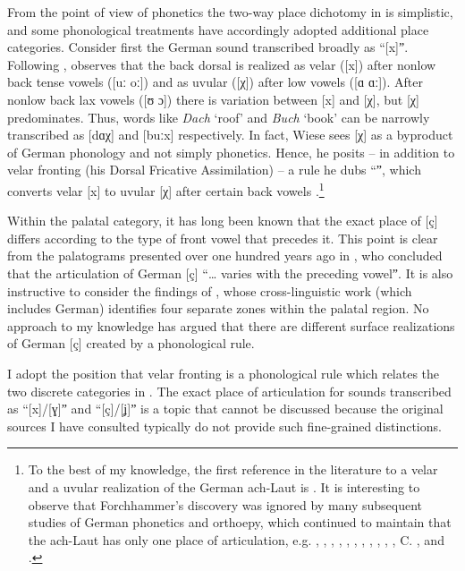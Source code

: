 From the point of view of phonetics the two-way place dichotomy in  is simplistic, and some phonological treatments have accordingly adopted additional place categories. Consider first the German sound transcribed broadly as “[x]ˮ. Following \citet{Kohler1990b, Kohler1990a}, \citet[210--216]{Wiese1996a} observes that the back dorsal is realized as velar ([x]) after nonlow back tense vowels ([uː oː]) and as uvular ([χ]) after low vowels ([ɑ ɑː]). After nonlow back lax vowels ([ʊ ɔ]) there is variation between [x] and [χ], but [χ] predominates. Thus, words like \textit{Dach} ‘roof’ and \textit{Buch} ‘book’ can be narrowly transcribed as [dɑχ] and [buːx] respectively. In fact, Wiese sees [χ] as a byproduct of German phonology and not simply phonetics. Hence, he posits -- in addition to velar fronting (his Dorsal Fricative Assimilation) {}-- a rule he dubs “ˮ, which converts velar [x] to uvular [χ] after certain back vowels \citep[213]{Wiese1996a}.\footnote{To the best of my knowledge, the first reference in the literature to a velar and a uvular realization of the German ach-Laut is \citet[164]{Forchhammer1994}. It is interesting to observe that Forchhammer's discovery was ignored by many subsequent studies of German phonetics and orthoepy, which continued to maintain that the ach-Laut has only one place of articulation, e.g. \citet[50-51]{Brandstein1950}, \citet[132-133]{Bithell1952}, \citet[76--77]{vonEssen1957}, \citet[153--154]{Heffner1960}, \citet[59]{Laziczius1961}, \citet[28--32]{Moulton1962}, \citet[176]{Richter1964}, \citet[167--168; 185--199]{MartensMartens1965}, \citet[88--89]{Schubiger1977}, \citet[39--40]{Wängler1981}, \citet[76--78]{Hakkarainen1995}, C. \citet[42--48]{Hall2003}, and \citet[76--78]{Russ2010}.}

Within the palatal category, it has long been known that the exact place of [ç] differs according to the type of front vowel that precedes it. This point is clear from the palatograms presented over one hundred years ago in \citet[309--310]{Scripture1902}, who concluded that the articulation of German [ç] “… varies with the preceding vowelˮ. It is also instructive to consider the findings of \citet{Recasens2013}, whose cross-linguistic work (which includes German) identifies four separate zones within the palatal region. No approach to my knowledge has argued that there are different surface realizations of German [ç] created by a phonological rule.

I adopt the position that velar fronting is a phonological rule which relates the two discrete categories in . The exact place of articulation for sounds transcribed as “[x]/[ɣ]ˮ and “[ç]/[ʝ]ˮ is a topic that cannot be discussed because the original sources I have consulted typically do not provide such fine-grained distinctions.

